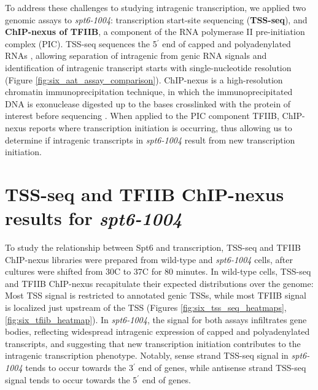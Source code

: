 To address these challenges to studying intragenic transcription, we applied two genomic assays to \textit{spt6-1004}: transcription start-site sequencing (\textbf{TSS-seq}), and \textbf{ChIP-nexus of TFIIB}, a component of the RNA polymerase II pre-initiation complex (PIC).
TSS-seq sequences the 5$^\prime$ end of capped and polyadenylated RNAs \citep{arribere2013, malabat2015}, allowing separation of intragenic from genic RNA signals and identification of intragenic transcript starts with single-nucleotide resolution (Figure \ref{fig:six_aat_assay_comparison}).
ChIP-nexus is a high-resolution chromatin immunoprecipitation technique, in which the immunoprecipitated DNA is exonuclease digested up to the bases crosslinked with the protein of interest before sequencing \citep{he2015}.
When applied to the PIC component TFIIB, ChIP-nexus reports where transcription initiation is occurring, thus allowing us to determine if intragenic transcripts in \textit{spt6-1004} result from new transcription initiation.

\section{TSS-seq and TFIIB ChIP-nexus results for \textit{spt6-1004}}
\label{sec:six_tss_tfiib}

To study the relationship between Spt6 and transcription, TSS-seq and TFIIB ChIP-nexus libraries were prepared from wild-type and \textit{spt6-1004} cells, after cultures were shifted from 30\textdegree C to 37\textdegree C for 80 minutes.
In wild-type cells, TSS-seq and TFIIB ChIP-nexus recapitulate their expected distributions over the genome: Most TSS signal is restricted to annotated genic TSSs, while most TFIIB signal is localized just upstream of the TSS (Figures \ref{fig:six_tss_seq_heatmaps}, \ref{fig:six_tfiib_heatmap}).
In \textit{spt6-1004}, the signal for both assays infiltrates gene bodies, reflecting widespread intragenic expression of capped and polyadenylated transcripts, and suggesting that new transcription initiation contributes to the intragenic transcription phenotype.
Notably, sense strand TSS-seq signal in \textit{spt6-1004} tends to occur towards the 3$^\prime$ end of genes, while antisense strand TSS-seq signal tends to occur towards the 5$^\prime$ end of genes.

\clearpage

